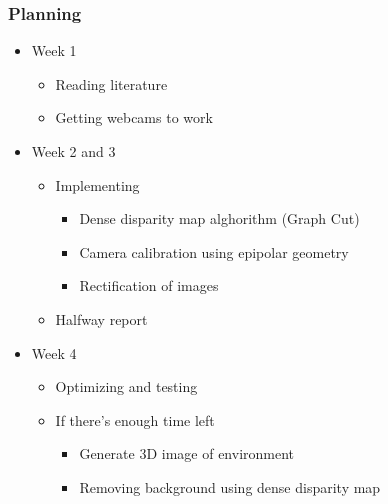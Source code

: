 \documentclass{beamer}
\begin{document}
\frame
{
  \frametitle{Planning}
  \begin{itemize}
    \item Week 1
      \begin{itemize}
        \item Reading literature
        \item Getting webcams to work
      \end{itemize}
    \item Week 2 and 3
      \begin{itemize}
        \item Implementing
          \begin{itemize}
            \item Dense disparity map alghorithm (Graph Cut)
            \item Camera calibration using epipolar geometry
            \item Rectification of images
          \end{itemize}
        \item Halfway report
      \end{itemize}
    \item Week 4
      \begin{itemize}
        \item Optimizing and testing
        \item If there's enough time left
          \begin{itemize}
            \item Generate 3D image of environment
            \item Removing background using dense disparity map
          \end{itemize}
      \end{itemize}
  \end{itemize}
}
\end{document}
